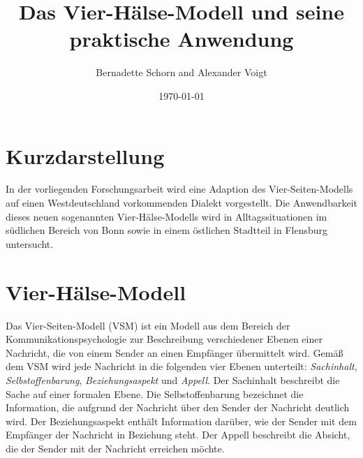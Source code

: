 \documentclass[11pt,DIV16,twocolumn]{scrartcl}
\title{Das Vier-Hälse-Modell und seine praktische Anwendung}
\author{Bernadette Schorn and Alexander Voigt}
\date{\today}
\begin{document}
\maketitle

\section*{Kurzdarstellung}

In der vorliegenden Forschungsarbeit wird eine Adaption des
Vier-Seiten-Modells auf einen Westdeutschland vorkommenden Dialekt
vorgestellt.  Die Anwendbarkeit dieses neuen sogenannten
Vier-Hälse-Modells wird in Alltagssituationen im südlichen Bereich von
Bonn sowie in einem östlichen Stadtteil in Flensburg untersucht.

\section{Vier-Hälse-Modell}

Das Vier-Seiten-Modell (VSM) \cite{VSM} ist ein Modell aus dem Bereich
der Kommunikationspsychologie zur Beschreibung verschiedener Ebenen
einer Nachricht, die von einem Sender an einen Empfänger übermittelt
wird.  Gemäß dem VSM wird jede Nachricht in die folgenden vier Ebenen
unterteilt: \textit{Sachinhalt}, \textit{Selbstoffenbarung},
\textit{Beziehungsaspekt} und \textit{Appell}.
%
Der Sachinhalt beschreibt die Sache auf einer formalen Ebene.  Die
Selbstoffenbarung bezeichnet die Information, die aufgrund der
Nachricht über den Sender der Nachricht deutlich wird.  Der
Beziehungsaspekt enthält Information darüber, wie der Sender mit dem
Empfänger der Nachricht in Beziehung steht.  Der Appell beschreibt die
Absicht, die der Sender mit der Nachricht erreichen möchte.
\end{document}
